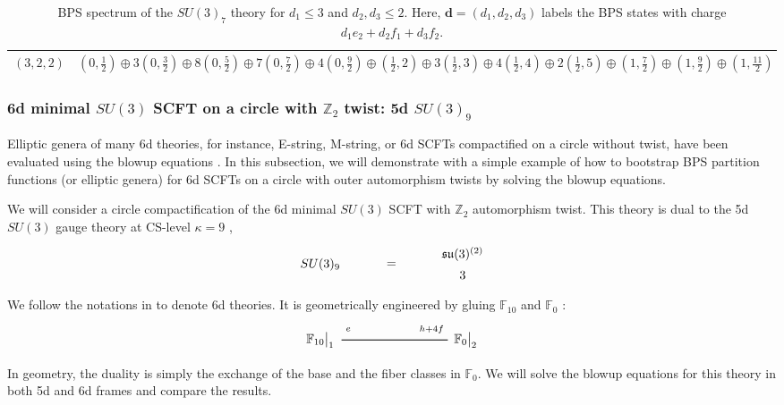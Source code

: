 \begin{table}
\begin{tabular}{|c|C{28ex}||c|C{28ex}|}
		$ (3, 2, 2) $ &  \\ \hline
	\end{tabular}
	\caption{BPS spectrum of the $SU(3)_7$ theory for $d_1 \leq 3$ and $ d_2, d_3 \leq 2 $. Here, $\mathbf{d} = (d_1, d_2, d_3)$ labels the BPS states with charge $d_1 e_2 + d_2 f_1 + d_3 f_2$.} \label{table:SU(3)_7}
\end{table}


\subsubsection{\texorpdfstring{6d minimal $ SU(3) $ SCFT on a circle with $ \mathbb{Z}_2 $ twist: 5d $SU(3)_9$}{6d SU(3) gauge theory with Z2 twist}} \label{subsubsec:SU3/Z2}

Elliptic genera of many 6d theories, for instance,  E-string, M-string, or 6d SCFTs compactified on a circle without twist, have been evaluated using the blowup equations \cite{Gu:2018gmy, Gu:2019dan, Gu:2019pqj, Gu:2020fem}. In this subsection, we will demonstrate with a simple example  of how to bootstrap BPS partition functions (or elliptic genera) for 6d SCFTs on a circle with outer automorphism twists by solving the blowup equations. 

We will consider a circle compactification of the 6d minimal $SU(3)$ SCFT with $\mathbb{Z}_2$ automorphism twist. This theory is dual to the 5d $SU(3)$ gauge theory at CS-level $\kappa=9$ \cite{Jefferson:2017ahm},
\begin{align}\label{eq:su3_9-6d}
\begin{tikzpicture}
\draw (0, 0) node {$ SU(3)_9 $}
(2, 0) node {$ = $}
(4, 0.3) node {$ \mathfrak{su}(3)^{(2)} $}
(4, -0.3) node {$ 3 $};
\end{tikzpicture}
\end{align}
We follow the notations in \cite{Bhardwaj:2019fzv} to denote 6d theories. It is geometrically engineered by gluing $ \mathbb{F}_{10} $ and $ \mathbb{F}_0 $ \cite{Jefferson:2018irk}:
\begin{align}\label{eq:su3_9_geo}
\begin{tikzpicture}
\draw[thick](-3,0)--(0,0);	
\node at(-3.6,0) {$\mathbb{F}_{10}{}\big|_1$};
\node at(-2.8,0.3) {${}_e$};
\node at(0.5,0) {$\mathbb{F}_{0}{}\big|_2$};
\node at(-0.45,0.3) {${}_{h+4f}$};
\end{tikzpicture} 
\end{align}
In geometry, the duality is simply the exchange of the base and the fiber classes in $\mathbb{F}_0$.
We will solve the blowup equations for this theory in both 5d and 6d frames and compare the results.

